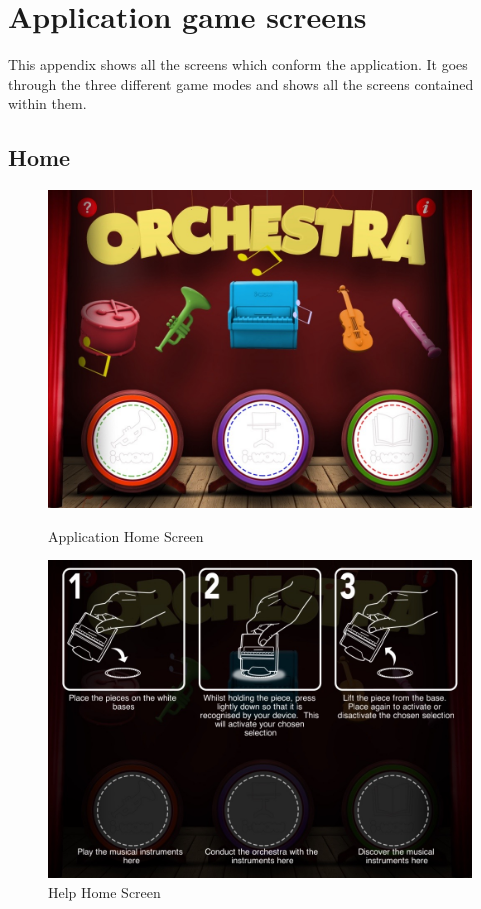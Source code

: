\cleardoublepage
\chapter{Application game screens}
\label{apdx:gamescreens}

This appendix shows all the screens which conform the application. It goes through the three different game modes and shows all the screens contained within them.

\cleardoublepage

\section{Home}

\begin{figure}[ht!]
  \centering
  \includegraphics[width=350pt]{graphics/use-case/home_screen.jpg}
  \vspace{0.05cm}
  \caption{Application Home Screen}
  \label{fig:home_screen}
  \vspace{0.6cm}

  \includegraphics[width=350pt]{graphics/use-case/help_home_screen.jpg}
  \vspace{0.05cm}
  \caption{Help Home Screen}
  \label{fig:help_home_screen}
\end{figure}

